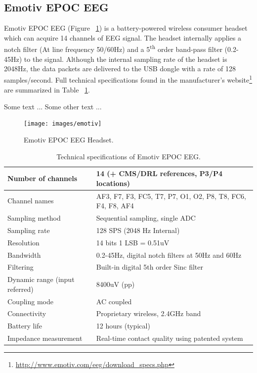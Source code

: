 \documentclass[12pt]{article}
\newcommand\mysubsection[1]{\subsection{#1}}
\numberwithin{equation}{section}
\numberwithin{figure}{section}
\numberwithin{table}{section}
\begin{document}
\mysubsection{Emotiv EPOC EEG}\label{seq:emotivepoceeg}

\par{
    Emotiv EPOC EEG (Figure ~\ref{fig:emotiv_epoc_headset}) is a battery-powered wireless consumer headset which can acquire 14 channels
    of EEG signal. The headset internally applies a notch filter (At line frequency 50/60Hz) and a
    5\textsuperscript{th} order band-pass filter (0.2-45Hz) to the signal. Although the internal sampling rate
    of the headset is 2048Hz, the data packets are delivered to the USB dongle with a rate of 128 samples/second.
    Full technical specifications found in the manufacturer's website\footnote{\url{http://www.emotiv.com/eeg/download_specs.php}} 
    are summarized in Table ~\ref{table:emotiv_epoc_specs}.
}
\par{
Some text \citep{sanei_eeg_2008}...
Some other text \citep{fazli_enhanced_2012}...
}
\begin{figure}[ht]
    \centering
    \texttt{[image: images/emotiv]}
    \caption{Emotiv EPOC EEG Headset.}
    \label{fig:emotiv_epoc_headset}
\end{figure}

\begin{table}
    \footnotesize
    \centering
    \caption{Technical specifications of Emotiv EPOC EEG.}
    \begin{tabular}{| l | l |}
        \hline
        Number of channels & 14 (+ CMS/DRL references, P3/P4 locations) \\ \hline
        Channel names & AF3, F7, F3, FC5, T7, P7, O1, O2, P8, T8, FC6, F4, F8, AF4 \\ \hline
        Sampling method & Sequential sampling, single ADC \\ \hline
        Sampling rate & 128 SPS (2048 Hz Internal) \\ \hline
        Resolution & 14 bits 1 LSB = 0.51uV \\ \hline
        Bandwidth & 0.2-45Hz, digital notch filters at 50Hz and 60Hz \\ \hline
        Filtering & Built-in digital 5th order Sinc filter \\ \hline
        Dynamic range (input referred) & 8400uV (pp) \\ \hline
        Coupling mode & AC coupled \\ \hline
        Connectivity & Proprietary wireless, 2.4GHz band \\ \hline
        Battery life & 12 hours (typical) \\ \hline
        Impedance measurement & Real-time contact quality using patented system \\ \hline
    \end{tabular}
    \label{table:emotiv_epoc_specs}
\end{table}
\end{document}
